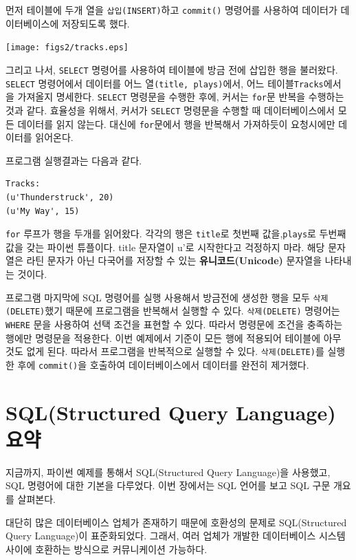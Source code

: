 먼저 테이블에 두개 열을 {\tt 삽입(INSERT)}하고 {\tt commit()} 명령어를 사용하여 데이터가 데이터베이스에 저장되도록 했다.

\beforefig
\centerline{\texttt{[image: figs2/tracks.eps]}}
\afterfig

그리고 나서, {\tt SELECT} 명령어를 사용하여 테이블에 방금 전에 삽입한 행을 불러왔다.
{\tt SELECT} 명령어에서 데이터를 어느 열{\tt (title, plays)}에서, 어느 테이블{\tt Tracks}에서 을 가져올지 명세한다.
{\tt SELECT} 명령문을 수행한 후에, 커서는 {\tt for}문 반복을 수행하는 것과 같다.
효율성을 위해서, 커서가 {\tt SELECT} 명령문을 수행할 때 데이터베이스에서 모든 데이터를 읽지 않는다. 
대신에 {\tt for}문에서 행을 반복해서 가져하듯이 요청시에만 데이터를 읽어온다.

프로그램 실행결과는 다음과 같다.

\beforeverb
\begin{verbatim}
Tracks:
(u'Thunderstruck', 20)
(u'My Way', 15)
\end{verbatim}
\afterverb
%

{\tt for} 루프가 행을 두개를 읽어왔다. 
각각의 행은 {\tt title}로 첫번째 값을,{\tt plays}로 두번째 값을 갖는 파이썬 튜플이다. 
title 문자열이 u'로 시작한다고 걱정하지 마라.
해당 문자열은 라틴 문자가 아닌 다국어를 저장할 수 있는 {\bf 유니코드(Unicode)} 문자열을 나타내는 것이다.

프로그램 마지막에 SQL 명령어를 실행 사용해서 방금전에 생성한 행을 모두 {\tt 삭제(DELETE)}했기 때문에 
프로그램을 반복해서 실행할 수 있다. 
{\tt 삭제(DELETE)} 명령어는 {\tt WHERE} 문을 사용하여 선택 조건을 표현할 수 있다.
따라서 명령문에 조건을 충족하는 행에만 명령문을 적용한다.
이번 예제에서 기준이 모든 행에 적용되어 테이블에 아무 것도 없게 된다.
따라서 프로그램을 반복적으로 실행할 수 있다.
{\tt 삭제(DELETE)}를 실행한 후에 {\tt commit()}을 호출하여 데이터베이스에서 데이터를 완전히 제거했다.

\section{SQL(Structured Query Language) 요약}

지금까지, 파이썬 예제를 통해서 SQL(Structured Query Language)을 사용했고, SQL 명령어에 대한 기본을 다루었다.
이번 장에서는 SQL 언어를 보고 SQL 구문 개요를 살펴본다.

대단히 많은 데이터베이스 업체가 존재하기 때문에 호환성의 문제로 SQL(Structured Query Language)이 표준화되었다.
그래서, 여러 업체가 개발한  데이터베이스 시스템 사이에 호환하는 방식으로 커뮤니케이션 가능하다.

